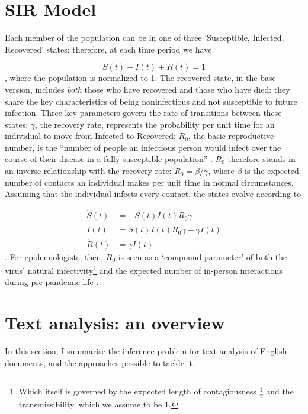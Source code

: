 \documentclass[12pt,a4]{article}
\begin{document}
\section{SIR Model}\label{sir}
Each member of the population can be in one of three `Susceptible, Infected, Recovered' states; therefore, at each time period we have

\begin{equation}\label{SIRstates}
    S(t) + I(t) + R(t) = 1
\end{equation}
, where the population is normalized to 1. The recovered state, in the base version, includes \textit{both} those who have recovered and those who have died: they share the key characteristics of being noninfectious and not susceptible to future infection. Three key parameters govern the rate of transitions between these states: \(\gamma\), the recovery rate, represents the probability per unit time for an individual to move from Infected to Recovered; \(R_0\), the basic reproductive number, is the ``number of people an infectious person would infect over the course of their disease in a fully susceptible population'' \parencite[81]{averyEconomistGuideEpidemiology2020}. \(R_0\) therefore stands in an inverse relationship with the recovery rate: \(R_0 = \beta / \gamma\), where \(\beta\) is the expected number of contacts an individual makes per unit time in normal circumstances. Assuming that the individual infects every contact, the states evolve according to 

\begin{align}
    \dot{S}(t)&= -S(t)I(t)R_0 \gamma \\
    \dot{I}(t)&= S(t)I(t)R_0 \gamma - \gamma I(t) \\
    \dot{R}(t)&= \gamma I(t)
\end{align}
. For epidemiologists, then, \(R_0\) is seen as a `compound parameter' of both the virus' natural infectivity\footnote{Which itself is governed by the expected length of contagiousness \(\frac{1}{\gamma}\) and the transmissibility, which we assume to be 1.} and the expected number of in-person interactions during pre-pandemic life \parencite[84]{averyEconomistGuideEpidemiology2020}.

\section{Text analysis: an overview}\label{textan}
In this section, I summarise the inference problem for text analysis of English documents, and the approaches possible to tackle it.
\end{document}
